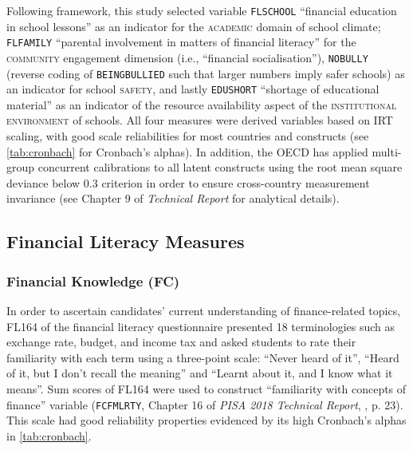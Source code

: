 Following  framework, this study selected variable \texttt{FLSCHOOL} ``financial education in school lessons'' as an indicator for the \textsc{academic} domain of school climate; \texttt{FLFAMILY} ``parental involvement in matters of financial literacy'' for the \textsc{community} engagement dimension (i.e., ``financial socialisation''), \texttt{NOBULLY} (reverse coding of \texttt{BEINGBULLIED} such that larger numbers imply safer schools) as an indicator for school \textsc{safety}, and lastly \texttt{EDUSHORT} ``shortage of educational material'' as an indicator of the resource availability aspect of the \textsc{institutional environment} of schools. All four measures were derived variables based on IRT scaling, with good scale reliabilities for most countries and constructs (see \cref{tab:cronbach} for Cronbach's alphas). In addition, the OECD has applied multi-group concurrent calibrations to all latent constructs using the root mean square deviance below $0.3$ criterion \parencite[for a technical discussion on RMSD, see][p. 244]{buchholz:2019} in order to ensure cross-country measurement invariance (see Chapter 9 of \textit{Technical Report} \parencite[][pp. 14--15]{PISAtech} for analytical details).



\subsection{Financial Literacy Measures}

\subsubsection{Financial Knowledge (FC)}

In order to ascertain candidates' current understanding of finance-related topics, \textsf{FL164} of the financial literacy questionnaire presented 18 terminologies such as exchange rate, budget, and income tax and asked students to rate their familiarity with each term using a three-point scale: ``Never heard of it'', ``Heard of it, but I don't recall the meaning'' and ``Learnt about it, and I know what it means''. Sum scores of \textsf{FL164} were used to construct ``familiarity with concepts of finance'' variable (\texttt{FCFMLRTY}, Chapter 16 of \textit{PISA 2018 Technical Report}, \textcite{PISAtech}, p. 23). This scale had good reliability properties evidenced by its high Cronbach's alphas in \cref{tab:cronbach}.

